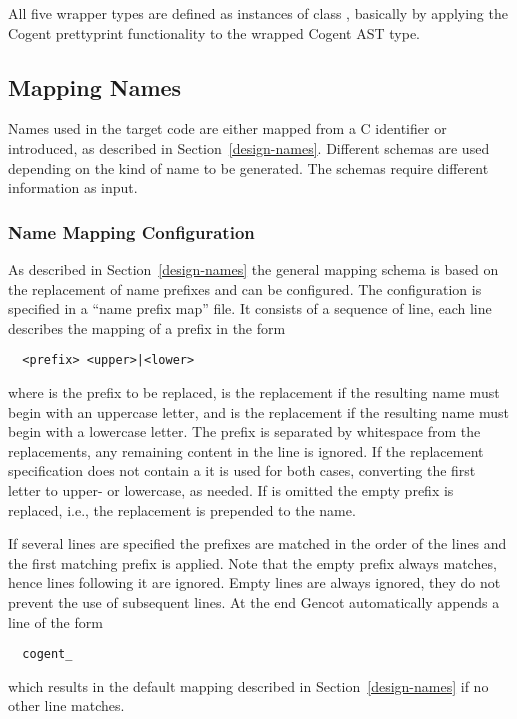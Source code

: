 All five wrapper types are defined as instances of class , basically by applying the Cogent prettyprint
functionality to the wrapped Cogent AST type.

\subsection{Mapping Names}
\label{impl-ccode-names}

Names used in the target code are either mapped from a C identifier or introduced, as described in 
Section~\ref{design-names}. Different schemas are used depending on the kind of name to be generated.
The schemas require different information as input.

\subsubsection{Name Mapping Configuration}

As described in Section~\ref{design-names} the general mapping schema is based on the replacement of 
name prefixes and can be configured. The configuration is specified in a ``name prefix map'' file.
It consists of a sequence of line, each line describes the mapping of a prefix in the form
\begin{verbatim}
  <prefix> <upper>|<lower>
\end{verbatim}
where  is the prefix to be replaced,  is the replacement if the resulting 
name must begin with an uppercase letter, and  is the replacement if the resulting name 
must begin with a lowercase letter. The prefix is separated by whitespace from the replacements, any remaining content 
in the line is ignored. If the replacement specification does not contain a  it is used for
both cases, converting the first letter to upper- or lowercase, as needed. If  is omitted
the empty prefix is replaced, i.e., the replacement is prepended to the name. 

If several lines are specified the prefixes are matched in the order of the lines and the first matching
prefix is applied. Note that the empty prefix always matches, hence lines following it are ignored.
Empty lines are always ignored, they do not prevent the use of subsequent lines.
At the end Gencot automatically appends a line of the form
\begin{verbatim}
  cogent_
\end{verbatim}
which results in the default mapping described in Section~\ref{design-names} if no other line matches.

